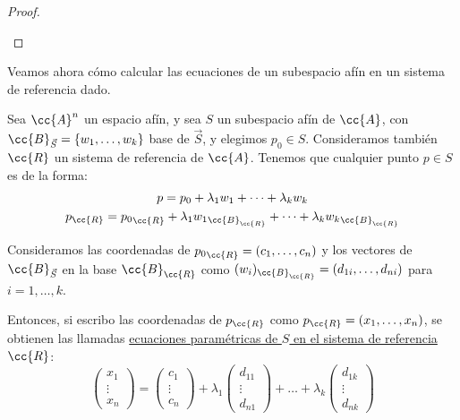 \begin{proof}
\begin{enumerate}
\begin{comment}
        Como $\vec{pq} = \vec{pa_0} + \vec{a_0q}$, por la unicidad de coordenadas de un vector en la misma base, tenemos que ambos resultados son iguales. Por tanto,
        \begin{equation*}
            z_1v_1+\dots+z_nv_n = (a_0-a_0) + (y_1-x_1)v_1 + \dots + (y_n-x_n)v_n \Longrightarrow \left(\vec{pq}\right)_{\cc{B}}=q_{\cc{R}}-p_{\cc{R}}
        \end{equation*}
    \end{comment}
    \end{enumerate}
\end{proof}


Veamos ahora cómo calcular las ecuaciones de un subespacio afín en un sistema de referencia dado.

Sea $\cc{A}^n$ un espacio afín, y sea $S$ un subespacio afín de $\cc{A}$, con $\cc{B}_{\vec{S}}=\{w_1,\dots,w_k\}$ base de $\vec{S}$, y elegimos $p_0\in S$. Consideramos también $\cc{R}$ un sistema de referencia de $\cc{A}$. Tenemos que cualquier punto $p\in S$ es de la forma:
\begin{gather*}
    p=p_0+\lambda_1w_1+\dots + \lambda_kw_k\\
    p_{\cc{R}}={p_0}_{\cc{R}} + \lambda_1{w_1}_{\cc{B}_{\cc{R}}} + \dots + \lambda_k{w_k}_{\cc{B}_{\cc{R}}}
\end{gather*}

Consideramos las coordenadas de ${p_0}_{\cc{R}}=(c_1,\dots,c_n)$ y los vectores de $\cc{B}_{\vec{S}}$ en la base $\cc{B}_{\cc{R}}$ como $(w_i)_{\cc{B}_{\cc{R}}}=(d_{1i},\dots, d_{ni})$ para $i=1,\dots,k$. 

Entonces, si escribo las coordenadas de $p_{\cc{R}}$ como $p_{\cc{R}}=(x_1,\dots, x_n)$, se obtienen las llamadas \ul{ecuaciones paramétricas de $S$ en el sistema de referencia $\cc{R}$}:
\begin{equation*}
    \left(\begin{array}{c}
        x_1 \\ \vdots \\ x_n
    \end{array}\right)
    = \left(\begin{array}{c}
        c_1 \\ \vdots \\ c_n
    \end{array}\right)
    +\lambda_1 \left(\begin{array}{c}
        d_{11} \\ \vdots \\ d_{n1}
    \end{array}\right)
    +\dots
    + \lambda_k \left(\begin{array}{c}
        d_{1k} \\ \vdots \\ d_{nk}
    \end{array}\right)
\end{equation*}


